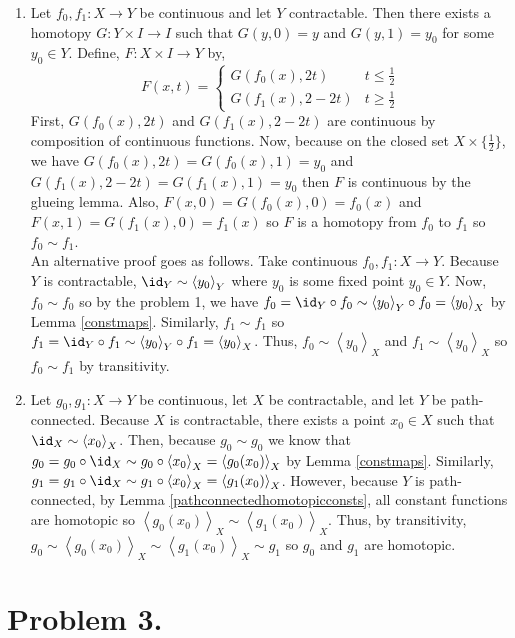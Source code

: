 \documentclass[12pt]{extarticle}
\newcommand{\const}[2]{\left< #1 \right>_{#2}}
\begin{document}
\begin{enumerate}
\item Let $f_0, f_1 : X \to Y$ be continuous and let $Y$ contractable. Then there exists a homotopy $G : Y \times I \to I$ such that $G(y, 0) = y$ and $G(y, 1) = y_0$ for some $y_0 \in Y$. Define, $F : X \times I \to Y$ by,
\[ F(x, t) = 
\begin{cases}
G(f_0(x), 2t) & t \le \frac{1}{2} \\
G(f_1(x), 2 -2t) & t \ge \frac{1}{2}
\end{cases}\]
First, $G(f_0(x), 2t)$ and $G(f_1(x), 2 - 2t)$ are continuous by composition of continuous functions. Now, because on the closed set $X \times \{\frac{1}{2}\}$, we have $G(f_0(x), 2t) = G(f_0(x), 1) = y_0$ and $G(f_1(x), 2 - 2t) = G(f_1(x), 1) = y_0$ then $F$ is continuous by the glueing lemma. Also, $F(x, 0) = G(f_0(x), 0) = f_0(x)$ and $F(x, 1) = G(f_1(x), 0) = f_1(x)$ so $F$ is a homotopy from $f_0$ to $f_1$ so $f_0 \sim f_1$.  \bigskip \\

An alternative proof goes as follows. Take continuous $f_0, f_1 : X \to Y$. Because $Y$ is contractable, $\id_Y \sim \const{y_0}{Y}$ where $y_0$ is some fixed point $y_0 \in Y$. Now, $f_0 \sim f_0$ so by the problem 1, we have $f_0 = \id_Y \circ f_0 \sim \const{y_0}{Y} \circ f_0 = \const{y_0}{X}$ by Lemma \ref{constmaps}. Similarly, $f_1 \sim f_1$ so $f_1 = \id_Y \circ f_1 \sim \const{y_0}{Y} \circ f_1 = \const{y_0}{X}$. Thus, $f_0 \sim \const{y_0}{X}$ and $f_1 \sim \const{y_0}{X}$ so $f_0 \sim f_1$ by transitivity. 

\item Let $g_0, g_1 : X \to Y$ be continuous, let $X$ be contractable, and let $Y$ be path-connected. Because $X$ is contractable, there exists a point $x_0 \in X$ such that $\id_X \sim \const{x_0}{X}$. Then, because $g_0 \sim g_0$ we know that $g_0 = g_0 \circ \id_X \sim g_0 \circ \const{x_0}{X} = \const{g_0(x_0)}{X}$ by Lemma \ref{constmaps}. Similarly, $g_1 = g_1 \circ \id_X \sim g_1 \circ \const{x_0}{X} = \const{g_1(x_0)}{X}$. However, because $Y$ is path-connected, by Lemma \ref{pathconnectedhomotopicconsts}, all constant functions are homotopic so $\const{g_0(x_0)}{X} \sim \const{g_1(x_0)}{X}$. Thus, by transitivity, $g_0 \sim \const{g_0(x_0)}{X} \sim \const{g_1(x_0)}{X} \sim g_1$ so $g_0$ and $g_1$ are homotopic.  
\end{enumerate}  

\section*{Problem 3.} 
\end{document}
